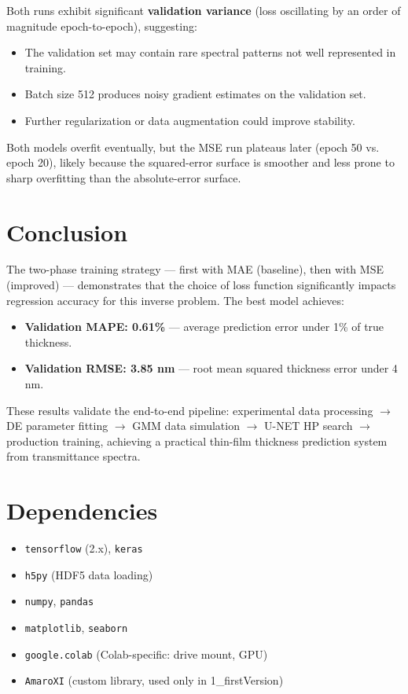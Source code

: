\documentclass[11pt,a4paper]{article}
\begin{document}
Both runs exhibit significant \textbf{validation variance} (loss oscillating by an order of magnitude epoch-to-epoch), suggesting:
\begin{itemize}
    \item The validation set may contain rare spectral patterns not well represented in training.
    \item Batch size 512 produces noisy gradient estimates on the validation set.
    \item Further regularization or data augmentation could improve stability.
\end{itemize}

Both models overfit eventually, but the MSE run plateaus later (epoch 50 vs. epoch 20), likely because the squared-error surface is smoother and less prone to sharp overfitting than the absolute-error surface.

\section{Conclusion}

The two-phase training strategy — first with MAE (baseline), then with MSE (improved) — demonstrates that the choice of loss function significantly impacts regression accuracy for this inverse problem. The best model achieves:

\begin{itemize}
    \item \textbf{Validation MAPE: 0.61\%} — average prediction error under 1\% of true thickness.
    \item \textbf{Validation RMSE: 3.85 nm} — root mean squared thickness error under 4 nm.
\end{itemize}

These results validate the end-to-end pipeline: experimental data processing $\rightarrow$ DE parameter fitting $\rightarrow$ GMM data simulation $\rightarrow$ U-NET HP search $\rightarrow$ production training, achieving a practical thin-film thickness prediction system from transmittance spectra.

\section{Dependencies}

\begin{itemize}
    \item \texttt{tensorflow} (2.x), \texttt{keras}
    \item \texttt{h5py} (HDF5 data loading)
    \item \texttt{numpy}, \texttt{pandas}
    \item \texttt{matplotlib}, \texttt{seaborn}
    \item \texttt{google.colab} (Colab-specific: drive mount, GPU)
    \item \texttt{AmaroXI} (custom library, used only in 1\_firstVersion)
\end{itemize}
\end{document}
